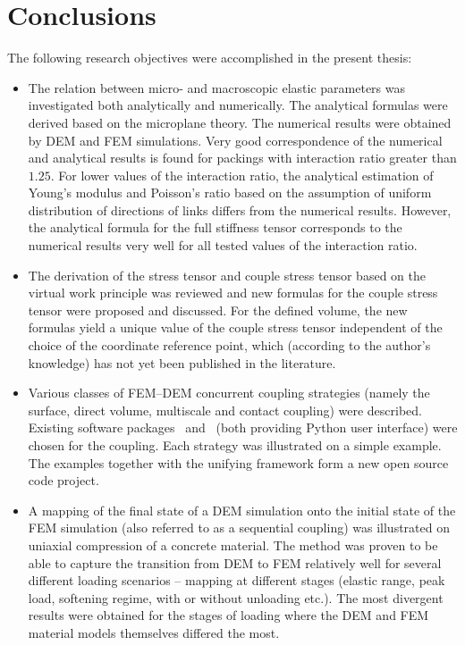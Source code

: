 \chapter{Conclusions}
The following research objectives were accomplished in the present thesis:

\begin{itemize}

\item
The relation between micro- and macroscopic elastic parameters was investigated both analytically and numerically.
The analytical formulas were derived based on the microplane theory.
The numerical results were obtained by DEM and FEM simulations.
Very good correspondence of the numerical and analytical results is found for packings with interaction ratio greater than $1{.}25$.
For lower values of the interaction ratio, the analytical estimation of Young's modulus and Poisson's ratio based on the assumption of uniform distribution of directions of links differs from the numerical results.
However, the analytical formula for the full stiffness tensor corresponds to the numerical results very well for all tested values of the interaction ratio.

\item
The derivation of the stress tensor and couple stress tensor based on the virtual work principle was reviewed and new formulas for the couple stress tensor were proposed and discussed.
For the defined volume, the new formulas yield a unique value of the couple stress tensor independent of the choice of the coordinate reference point, which (according to the author's knowledge) has not yet been published in the literature.
	
\item
Various classes of FEM--DEM concurrent coupling strategies (namely the surface, direct volume, multiscale and contact coupling) were described.
Existing software packages \OOFEM\ and \YADE\ (both providing Python user interface) were chosen for the coupling.
Each strategy was illustrated on a simple example.
The examples together with the unifying framework form a new open source code project.

\item
A mapping of the final state of a DEM simulation onto the initial state of the FEM simulation (also referred to as a sequential coupling) was illustrated on uniaxial compression of a concrete material.
The method was proven to be able to capture the transition from DEM to FEM relatively well for several different loading scenarios -- mapping at different stages (elastic range, peak load, softening regime, with or without unloading etc.).
The most divergent results were obtained for the stages of loading where the DEM and FEM material models themselves differed the most.


\end{itemize}
